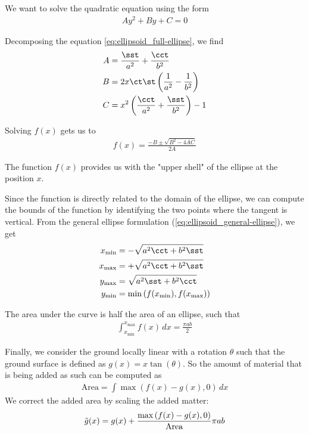 We want to solve the quadratic equation using the form 
\begin{align}
    Ay^2 + By + C = 0
\end{align}

Decomposing the equation \eqref{eq:ellipsoid_full-ellipse}, we find
\begin{align}
    A &= \frac{\sst}{a^2} + \frac{\cct}{b^2} \\
    B &= 2x \ct \st \left( \frac{1}{a^2} - \frac{1}{b^2} \right) \\
    C &= x^2 \left( \frac{\cct}{a^2} + \frac{\sst}{b^2} \right) - 1
\end{align}

Solving $f(x)$ gets us to 
\begin{align}
    \label{eq:ellipsoid_final-ellipse}
    f(x) = \frac{-B \pm \sqrt{B^2 - 4 A C}}{2 A}
\end{align}

The function $f(x)$ provides us with the "upper shell" of the ellipse at the position $x$.

Since the function is directly related to the domain of the ellipse, we can compute the bounds of the function by identifying the two points where the tangent is vertical. From the general ellipse formulation (\eqref{eq:ellipsoid_general-ellipse}), we get 
\begin{align}
    \label{eq:ellipsoid_ellipse-bounds}
    x_{\text{min}} &= -\sqrt{a^2 \cct + b^2 \sst} \\
    x_{\text{max}} &= +\sqrt{a^2 \cct + b^2 \sst} \\
    y_{\text{max}} &= \sqrt{a^2 \sst + b^2 \cct} \\
    y_{\text{min}} &= \min\left( f(x_{\text{min}}), f(x_{\text{max}}) \right)
\end{align}

The area under the curve is half the area of an ellipse, such that 
\begin{align}
    \int_{x_{\text{min}}}^{x_{\text{max}}} f(x) \,dx = \frac{\pi a b}{2}
\end{align}

Finally, we consider the ground locally linear with a rotation $\theta$ such that the ground surface is defined as $g(x) = x \tan(\theta)$. So the amount of material that is being added as such can be computed as 
\begin{align}
    \text{Area} = \int \max \left( f(x) - g(x), 0 \right) \, dx
\end{align}
We correct the added area by scaling the added matter:
\begin{align}
    \Tilde{g}(x) = g(x) + \frac{\max \left( f(x) - g(x), 0 \right)}{\text{Area}} \pi a b
\end{align}










